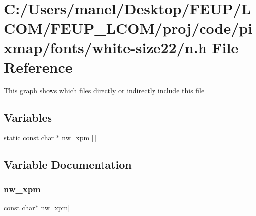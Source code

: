 \hypertarget{white-size22_2n_8h}{}\section{C\+:/\+Users/manel/\+Desktop/\+F\+E\+U\+P/\+L\+C\+O\+M/\+F\+E\+U\+P\+\_\+\+L\+C\+O\+M/proj/code/pixmap/fonts/white-\/size22/n.h File Reference}
\label{white-size22_2n_8h}
This graph shows which files directly or indirectly include this file\+:
\subsection*{Variables}
\begin{DoxyCompactItemize}
\item 
static const char $\ast$ \mbox{\hyperlink{white-size22_2n_8h_a6c3e42d8641d2c7ba7d603230d31487a}{nw\+\_\+xpm}} \mbox{[}$\,$\mbox{]}
\end{DoxyCompactItemize}


\subsection{Variable Documentation}
\mbox{\label{white-size22_2n_8h_a6c3e42d8641d2c7ba7d603230d31487a}} 
\subsubsection{\texorpdfstring{nw\_xpm}{nw\_xpm}}
{\footnotesize\ttfamily const char$\ast$ nw\+\_\+xpm\mbox{[}$\,$\mbox{]}\hspace{0.3cm}{\ttfamily [static]}}

